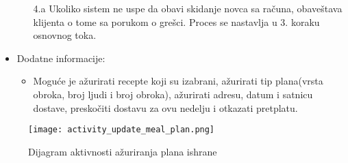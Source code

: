 \begin{itemize}
\begin{itemize}
            \item[4.a] Ukoliko sistem ne uspe da obavi skidanje novca sa računa, obaveštava klijenta o tome sa porukom o grešci. Proces se nastavlja u 3. koraku osnovnog toka.
        \end{itemize}
    \item Dodatne informacije:
        \begin{itemize}
            \item Moguće je ažurirati recepte koji su izabrani, ažurirati tip plana(vrsta obroka, broj ljudi i broj obroka), ažurirati adresu, datum i satnicu dostave, preskočiti dostavu za ovu nedelju i otkazati pretplatu. 
        \end{itemize}
\end{itemize}

\begin{figure}[H]
\begin{center}
\texttt{[image: activity\_update\_meal\_plan.png]}
\end{center}
    \caption{Dijagram aktivnosti ažuriranja plana ishrane}
\label{fig:ActivityUpdateMealPlan}
\end{figure}
